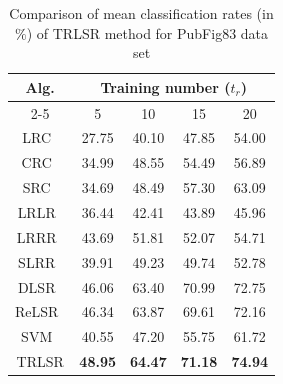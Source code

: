  \begin{table}
\caption{Comparison of mean classification rates (in $\%$) of TRLSR method for PubFig83 data set}
\label{table: TRLSR_Accuracy_Pubfig}
\centering
\begin{tabular}{|c|cccc|}
\hline
\multirow{2}{*}{Alg.} & \multicolumn{4}{c|}{Training number ($t_r$)}                                                                                     \\ \cline{2-5} 
                      & \multicolumn{1}{c|}{5}              & \multicolumn{1}{c|}{10}             & \multicolumn{1}{c|}{15}             & 20             \\ \hline
LRC~\cite{LRC}                   & \multicolumn{1}{c|}{27.75}          & \multicolumn{1}{c|}{40.10}          & \multicolumn{1}{c|}{47.85}          & 54.00          \\ \hline
CRC~\cite{CRC}                   & \multicolumn{1}{c|}{34.99}          & \multicolumn{1}{c|}{48.55}          & \multicolumn{1}{c|}{54.49}          & 56.89          \\ \hline
SRC~\cite{SRC}                   & \multicolumn{1}{c|}{34.69}          & \multicolumn{1}{c|}{48.49}          & \multicolumn{1}{c|}{57.30}          & 63.09          \\ \hline
LRLR~\cite{LRLR_SLRR}                  & \multicolumn{1}{c|}{36.44}          & \multicolumn{1}{c|}{42.41}          & \multicolumn{1}{c|}{43.89}          & 45.96          \\ \hline
LRRR~\cite{LRLR_SLRR}                  & \multicolumn{1}{c|}{43.69}          & \multicolumn{1}{c|}{51.81}          & \multicolumn{1}{c|}{52.07}          & 54.71          \\ \hline
SLRR~\cite{LRLR_SLRR}                  & \multicolumn{1}{c|}{39.91}          & \multicolumn{1}{c|}{49.23}          & \multicolumn{1}{c|}{49.74}          & 52.78          \\ \hline
DLSR~\cite{DLSR}                  & \multicolumn{1}{c|}{46.06}          & \multicolumn{1}{c|}{63.40}          & \multicolumn{1}{c|}{70.99}          & 72.75          \\ \hline
ReLSR~\cite{ReLSR}                 & \multicolumn{1}{c|}{46.34}          & \multicolumn{1}{c|}{63.87}          & \multicolumn{1}{c|}{69.61}          & 72.16          \\ \hline
SVM~\cite{SVM}                   & \multicolumn{1}{c|}{40.55}          & \multicolumn{1}{c|}{47.20}          & \multicolumn{1}{c|}{55.75}          & 61.72          \\ \hline
TRLSR                 & \multicolumn{1}{c|}{\textbf{48.95}} & \multicolumn{1}{c|}{\textbf{64.47}} & \multicolumn{1}{c|}{\textbf{71.18}} & \textbf{74.94} \\ \hline
\end{tabular}
\end{table}
